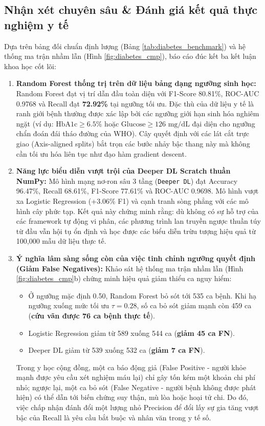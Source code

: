\documentclass[12pt,a4paper]{report}
\begin{document}
\subsection{Nhận xét chuyên sâu \& Đánh giá kết quả thực nghiệm y tế}
Dựa trên bảng đối chuẩn định lượng (Bảng \ref{tab:diabetes_benchmark}) và hệ thống ma trận nhầm lẫn (Hình \ref{fig:diabetes_cmp}), báo cáo đúc kết ba kết luận khoa học cốt lõi:
\begin{enumerate}
    \item \textbf{Random Forest thống trị trên dữ liệu bảng dạng ngưỡng sinh học:} 
    Random Forest đạt vị trí dẫn đầu toàn diện với F1-Score 80.81\%, ROC-AUC 0.9768 và Recall đạt \textbf{72.92\%} tại ngưỡng tối ưu. Đặc thù của dữ liệu y tế là ranh giới bệnh thường được xác lập bởi các ngưỡng giới hạn sinh hóa nghiêm ngặt (ví dụ: $\text{HbA1c} \ge 6.5\%$ hoặc $\text{Glucose} \ge 126\text{ mg/dL}$ đại diện cho ngưỡng chẩn đoán đái tháo đường của WHO). Cây quyết định với các lát cắt trực giao (Axis-aligned splits) bắt trọn các bước nhảy bậc thang này mà không cần tối ưu hóa liên tục như đạo hàm gradient descent.
    
    \item \textbf{Năng lực biểu diễn vượt trội của Deeper DL Scratch thuần NumPy:}
    Mô hình mạng nơ-ron sâu 3 tầng (\texttt{Deeper DL}) đạt Accuracy 96.47\%, Recall 68.61\%, F1-Score 77.61\% và ROC-AUC 0.9698. Mô hình vượt xa Logistic Regression (+3.06\% F1) và cạnh tranh sòng phẳng với các mô hình cây phức tạp. Kết quả này chứng minh rằng: dù không có sự hỗ trợ của các framework tự động vi phân, các phương trình lan truyền ngược thuần túy từ đầu vẫn hội tụ ổn định và học được các biểu diễn trừu tượng hiệu quả từ 100,000 mẫu dữ liệu thực tế.

    \item \textbf{Ý nghĩa lâm sàng sống còn của việc tinh chỉnh ngưỡng quyết định (Giảm False Negatives):}
    Khảo sát hệ thống ma trận nhầm lẫn (Hình \ref{fig:diabetes_cmp}b) chứng minh hiệu quả giảm thiểu ca nguy hiểm:
    \begin{itemize}
        \item Ở ngưỡng mặc định 0.50, Random Forest bỏ sót tới 535 ca bệnh. Khi hạ ngưỡng xuống mức tối ưu $\tau = 0.28$, số ca bỏ sót giảm mạnh còn 459 ca (\textbf{cứu vãn được 76 ca bệnh thực tế}).
        \item Logistic Regression giảm từ 589 xuống 544 ca (\textbf{giảm 45 ca FN}).
        \item Deeper DL giảm từ 539 xuống 532 ca (\textbf{giảm 7 ca FN}).
    \end{itemize}
    Trong y học cộng đồng, một ca báo động giả (False Positive - người khỏe mạnh được yêu cầu xét nghiệm máu lại) chỉ gây tốn kém một khoản chi phí nhỏ; ngược lại, một ca bỏ sót (False Negative - người bệnh không được phát hiện) có thể dẫn tới biến chứng suy thận, mù lòa hoặc hoại tử chi. Do đó, việc chấp nhận đánh đổi một lượng nhỏ Precision để đổi lấy sự gia tăng vượt bậc của Recall là yêu cầu bắt buộc và nhân văn trong y tế số.
\end{enumerate}
\end{document}
